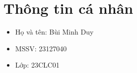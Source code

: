 \section{Thông tin cá nhân}

\begin{itemize}
	\item Họ và tên: Bùi Minh Duy
	\item MSSV: 23127040
	\item Lớp: 23CLC01
\end{itemize}
